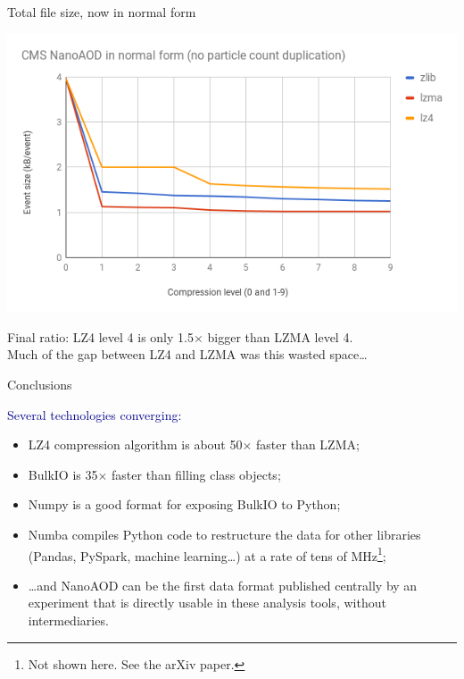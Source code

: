 \documentclass{beamer}
\begin{document}
\begin{frame}{Total file size, now in normal form}
\begin{center}
\includegraphics[width=\linewidth]{final-size.png}
\end{center}

Final ratio: LZ4 level 4 is only 1.5$\times$ bigger than LZMA level 4. \\
Much of the gap between LZ4 and LZMA was this wasted space\ldots
\end{frame}

\begin{frame}{Conclusions}
\vspace{0.5 cm}

\textcolor{darkblue}{Several technologies converging:}
\begin{itemize}\setlength{\itemsep}{0.25 cm}
\item LZ4 compression algorithm is about 50$\times$ faster than LZMA;
\item BulkIO is 35$\times$ faster than filling class objects;
\item Numpy is a good format for exposing BulkIO to Python;
\item Numba compiles Python code to restructure the data for other libraries (Pandas, PySpark, machine learning\ldots) at a rate of tens of MHz\footnote{Not shown here. See the arXiv paper.};
\end{itemize}

\vspace{0.25 cm}
\begin{itemize}
\item<2-> \ldots and NanoAOD can be the first data format published centrally by an experiment that is directly usable in these analysis tools, without intermediaries.
\end{itemize}
\end{frame}
\end{document}
